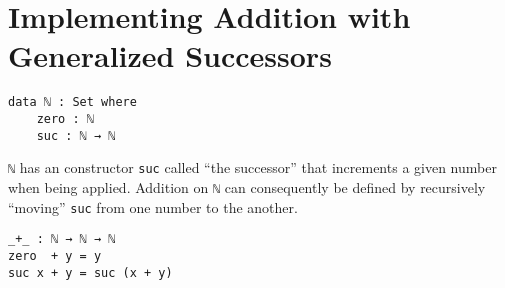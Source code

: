 \documentclass[\main/thesis.tex]{subfiles}
\begin{document}
\section{Implementing Addition with Generalized Successors}\label{addition}

\begin{lstlisting}
data ℕ : Set where
    zero : ℕ
    suc : ℕ → ℕ
\end{lstlisting}

\lstinline|ℕ| has an constructor \lstinline|suc| called ``the successor''
that increments a given number when being applied.
Addition on \lstinline|ℕ| can consequently be defined by recursively ``moving''
\lstinline|suc| from one number to the another.

\begin{lstlisting}
_+_ : ℕ → ℕ → ℕ
zero  + y = y
suc x + y = suc (x + y)
\end{lstlisting}

%





%
%
%
\end{document}
